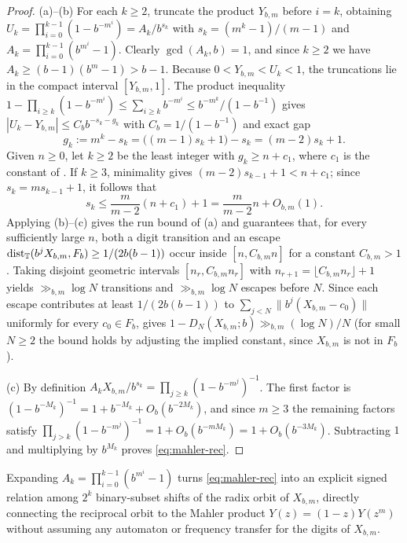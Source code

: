 \documentclass[11pt]{article}
\newcommand{\dist}[1]{\lVert #1\rVert}
\begin{document}
\begin{proof}
(a)--(b) For each $k\ge2$, truncate the product $Y_{b,m}$ before $i=k$, obtaining $U_k=\prod_{i=0}^{k-1}(1-b^{-m^i})=A_k/b^{s_k}$ with $s_k=(m^k-1)/(m-1)$ and $A_k=\prod_{i=0}^{k-1}(b^{m^i}-1)$. Clearly $\gcd(A_k,b)=1$, and since $k\ge2$ we have $A_k\ge(b-1)(b^m-1)>b-1$. Because $0<Y_{b,m}<U_k<1$, the truncations lie in the compact interval $[Y_{b,m},1]$. The product inequality $1-\prod_{i\ge k}(1-b^{-m^i})\le\sum_{i\ge k}b^{-m^i}\le b^{-m^k}/(1-b^{-1})$ gives $|U_k-Y_{b,m}|\le C_b b^{-s_k-g_k}$ with $C_b=1/(1-b^{-1})$ and exact gap
\[
g_k:=m^k-s_k=\bigl((m-1)s_k+1\bigr)-s_k=(m-2)s_k+1.
\]
Given $n\ge0$, let $k\ge2$ be the least integer with $g_k\ge n+c_1$, where $c_1$ is the constant of . If $k\ge3$, minimality gives $(m-2)s_{k-1}+1<n+c_1$; since $s_k=ms_{k-1}+1$, it follows that
\[
s_k\le\frac{m}{m-2}(n+c_1)+1=\frac{m}{m-2}n+O_{b,m}(1).
\]
Applying (b)--(c) gives the run bound of (a) and guarantees that, for every sufficiently large $n$, both a digit transition and an escape $\operatorname{dist}_{\mathbb T}(b^jX_{b,m},F_b)\ge 1/(2b(b-1))$ occur inside $[n,C_{b,m}n]$ for a constant $C_{b,m}>1$. Taking disjoint geometric intervals $[n_r,C_{b,m}n_r]$ with $n_{r+1}=\lfloor C_{b,m}n_r\rfloor+1$ yields $\gg_{b,m}\log N$ transitions and $\gg_{b,m}\log N$ escapes before $N$. Since each escape contributes at least $1/(2b(b-1))$ to $\sum_{j<N}\dist{b^j(X_{b,m}-c_0)}$ uniformly for every $c_0\in F_b$,  gives $1-D_N(X_{b,m};b)\gg_{b,m}(\log N)/N$ (for small $N\ge2$ the bound holds by adjusting the implied constant, since $X_{b,m}$ is not in $F_b$).

(c) By definition $A_kX_{b,m}/b^{s_k}=\prod_{j\ge k}(1-b^{-m^j})^{-1}$. The first factor is $(1-b^{-M_k})^{-1}=1+b^{-M_k}+O_b(b^{-2M_k})$, and since $m\ge3$ the remaining factors satisfy $\prod_{j>k}(1-b^{-m^j})^{-1}=1+O_b(b^{-mM_k})=1+O_b(b^{-3M_k})$. Subtracting $1$ and multiplying by $b^{M_k}$ proves \eqref{eq:mahler-rec}.
\end{proof}

Expanding $A_k=\prod_{i=0}^{k-1}(b^{m^i}-1)$ turns \eqref{eq:mahler-rec} into an explicit signed relation among $2^k$ binary-subset shifts of the radix orbit of $X_{b,m}$, directly connecting the reciprocal orbit to the Mahler product $Y(z)=(1-z)Y(z^m)$ without assuming any automaton or frequency transfer for the digits of $X_{b,m}$.
\end{document}
